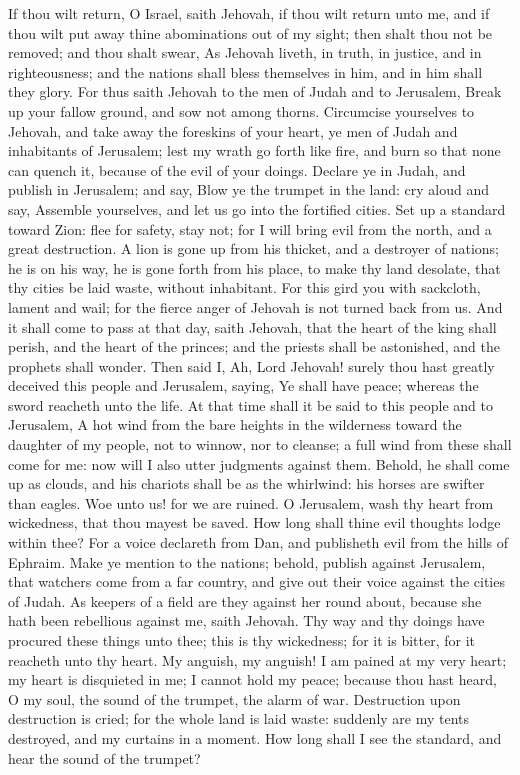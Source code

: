 If thou wilt return, O Israel, saith Jehovah, if thou wilt return unto me, and if thou wilt put away thine abominations out of my sight; then shalt thou not be removed; and thou shalt swear, As Jehovah liveth, in truth, in justice, and in righteousness; and the nations shall bless themselves in him, and in him shall they glory.  For thus saith Jehovah to the men of Judah and to Jerusalem, Break up your fallow ground, and sow not among thorns. Circumcise yourselves to Jehovah, and take away the foreskins of your heart, ye men of Judah and inhabitants of Jerusalem; lest my wrath go forth like fire, and burn so that none can quench it, because of the evil of your doings.  Declare ye in Judah, and publish in Jerusalem; and say, Blow ye the trumpet in the land: cry aloud and say, Assemble yourselves, and let us go into the fortified cities. Set up a standard toward Zion: flee for safety, stay not; for I will bring evil from the north, and a great destruction. A lion is gone up from his thicket, and a destroyer of nations; he is on his way, he is gone forth from his place, to make thy land desolate, that thy cities be laid waste, without inhabitant. For this gird you with sackcloth, lament and wail; for the fierce anger of Jehovah is not turned back from us. And it shall come to pass at that day, saith Jehovah, that the heart of the king shall perish, and the heart of the princes; and the priests shall be astonished, and the prophets shall wonder.  Then said I, Ah, Lord Jehovah! surely thou hast greatly deceived this people and Jerusalem, saying, Ye shall have peace; whereas the sword reacheth unto the life.  At that time shall it be said to this people and to Jerusalem, A hot wind from the bare heights in the wilderness toward the daughter of my people, not to winnow, nor to cleanse; a full wind from these shall come for me: now will I also utter judgments against them. Behold, he shall come up as clouds, and his chariots shall be as the whirlwind: his horses are swifter than eagles. Woe unto us! for we are ruined. O Jerusalem, wash thy heart from wickedness, that thou mayest be saved. How long shall thine evil thoughts lodge within thee? For a voice declareth from Dan, and publisheth evil from the hills of Ephraim. Make ye mention to the nations; behold, publish against Jerusalem, that watchers come from a far country, and give out their voice against the cities of Judah. As keepers of a field are they against her round about, because she hath been rebellious against me, saith Jehovah. Thy way and thy doings have procured these things unto thee; this is thy wickedness; for it is bitter, for it reacheth unto thy heart.  My anguish, my anguish! I am pained at my very heart; my heart is disquieted in me; I cannot hold my peace; because thou hast heard, O my soul, the sound of the trumpet, the alarm of war. Destruction upon destruction is cried; for the whole land is laid waste: suddenly are my tents destroyed, and my curtains in a moment. How long shall I see the standard, and hear the sound of the trumpet? 